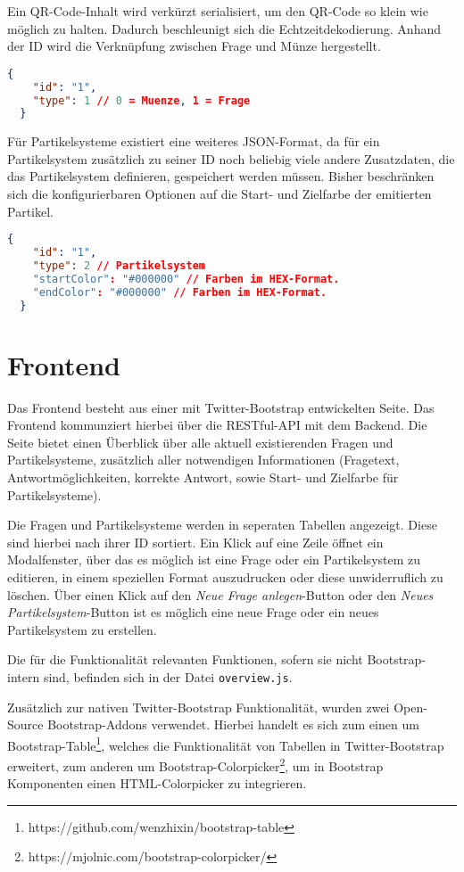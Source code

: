 Ein QR-Code-Inhalt wird verkürzt serialisiert, um den QR-Code so klein wie möglich zu halten. Dadurch beschleunigt sich die Echtzeitdekodierung. Anhand der ID wird die Verknüpfung zwischen Frage und Münze hergestellt.
\begin{lstlisting}[language=JSON]
  {
    "id": "1",
    "type": 1 // 0 = Muenze, 1 = Frage
  }
\end{lstlisting}

Für Partikelsysteme existiert eine weiteres JSON-Format, da für ein Partikelsystem zusätzlich zu seiner ID noch beliebig viele andere Zusatzdaten, die das Partikelsystem definieren, gespeichert werden müssen.
Bisher beschränken sich die konfigurierbaren Optionen auf die Start- und Zielfarbe der emitierten Partikel.

\begin{lstlisting}[language=JSON]
  {
    "id": "1",
    "type": 2 // Partikelsystem
    "startColor": "#000000" // Farben im HEX-Format.
    "endColor": "#000000" // Farben im HEX-Format.
  }
\end{lstlisting}

\section{Frontend}
Das Frontend besteht aus einer mit Twitter-Bootstrap entwickelten Seite. Das Frontend kommunziert hierbei über die RESTful-API mit dem Backend. Die Seite bietet einen Überblick über alle aktuell existierenden Fragen und Partikelsysteme, zusätzlich aller notwendigen Informationen (Fragetext, Antwortmöglichkeiten, korrekte Antwort, sowie Start- und Zielfarbe für Partikelsysteme).

Die Fragen und Partikelsysteme werden in seperaten Tabellen angezeigt. Diese sind hierbei nach ihrer ID sortiert. Ein Klick auf eine Zeile öffnet ein Modalfenster, über das es möglich ist eine Frage oder ein Partikelsystem zu editieren, in einem speziellen Format auszudrucken oder diese unwiderruflich zu löschen. Über einen Klick auf den \emph{Neue Frage anlegen}-Button oder den \emph{Neues Partikelsystem}-Button ist es möglich eine neue Frage oder ein neues Partikelsystem zu erstellen.

Die für die Funktionalität relevanten Funktionen, sofern sie nicht Bootstrap-intern sind, befinden sich in der Datei \texttt{overview.js}.

Zusätzlich zur nativen Twitter-Bootstrap Funktionalität, wurden zwei Open-Source Bootstrap-Addons verwendet. Hierbei handelt es sich zum einen um Bootstrap-Table\footnote{https://github.com/wenzhixin/bootstrap-table}, welches die Funktionalität von Tabellen in Twitter-Bootstrap erweitert, zum anderen um Bootstrap-Colorpicker\footnote{https://mjolnic.com/bootstrap-colorpicker/}, um in Bootstrap Komponenten einen HTML-Colorpicker zu integrieren.

